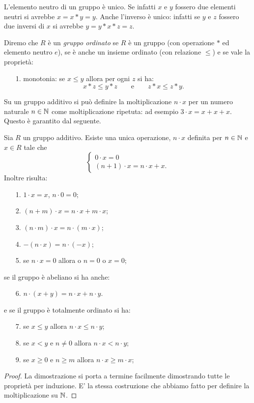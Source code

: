   L'elemento neutro di un gruppo è unico. 
  Se infatti $x$ e $y$ fossero due elementi neutri 
  si avrebbe $x = x*y = y$. 
  Anche l'inverso è unico: infatti se $y$ e $z$ fossero 
  due inversi di $x$ si avrebbe $y = y * x * z = z$.
  
  \begin{definition}
    \label{def:gruppo_ordinato}%
    Diremo che $R$ è un \emph{gruppo ordinato}%
%
 se $R$ è un gruppo
    (con operazione $*$ ed elemento neutro $e$),
    se è anche un insieme ordinato (con relazione $\le$)
    e se vale la proprietà:
    \begin{enumerate}
      \item[1.] monotonia: se $x\le y$ allora per ogni $z$ si ha:
       \[
       x*z \le y*z \qquad\text{e}\qquad z*x \le z*y.
       \] 
    \end{enumerate}
  \end{definition}

Su un gruppo additivo si può definire la moltiplicazione $n\cdot x$ per un numero 
naturale $n\in{\mathbb N}$ come moltiplicazione ripetuta:
ad esempio $3\cdot x = x + x + x$.
Questo è garantito dal seguente.
%
\begin{theorem}
  \label{th:addizione_ripetuta}%
Sia $R$ un gruppo additivo. 
Esiste una unica operazione, $n \cdot x$ definita per $n\in {\mathbb N}$ 
e $x\in R$ tale che
\[
\begin{cases}
  0\cdot x  = 0 \\
  (n+1) \cdot x = n\cdot x + x.
\end{cases}  
\]
Inoltre risulta:
\begin{enumerate}
  \item[1.] $1\cdot x = x$, $n\cdot 0 = 0$;
  \item[2.] $(n+m)\cdot x = n\cdot x + m\cdot x$; 
  \item[3.] $(n\cdot m)\cdot x = n\cdot (m\cdot x)$;
  \item[4.] $-(n\cdot x) = n\cdot(-x)$;
  \item[5.] se $n\cdot x = 0$ allora o $n=0$ o $x=0$;
\end{enumerate}
se il gruppo è abeliano si ha anche:
\begin{enumerate}
\item[6.] $n\cdot(x+y) = n\cdot x + n\cdot y$.
\end{enumerate}
e se il gruppo è totalmente ordinato si ha:
\begin{enumerate}
  \item[7.] se $x \le y$ allora $n\cdot x \le n\cdot y$;
  \item[8.] se $x < y$ e $n \neq 0$ allora $n\cdot x < n\cdot y$;
  \item[9.] se $x\ge 0$ e $n\ge m$ allora $n\cdot x\ge m\cdot x$;
\end{enumerate}
\end{theorem}
%
\begin{proof}
La dimostrazione si porta a termine facilmente dimostrando tutte le proprietà 
per induzione.
E' la stessa costruzione che abbiamo fatto per definire 
la moltiplicazione su ${\mathbb N}$.
\end{proof}

